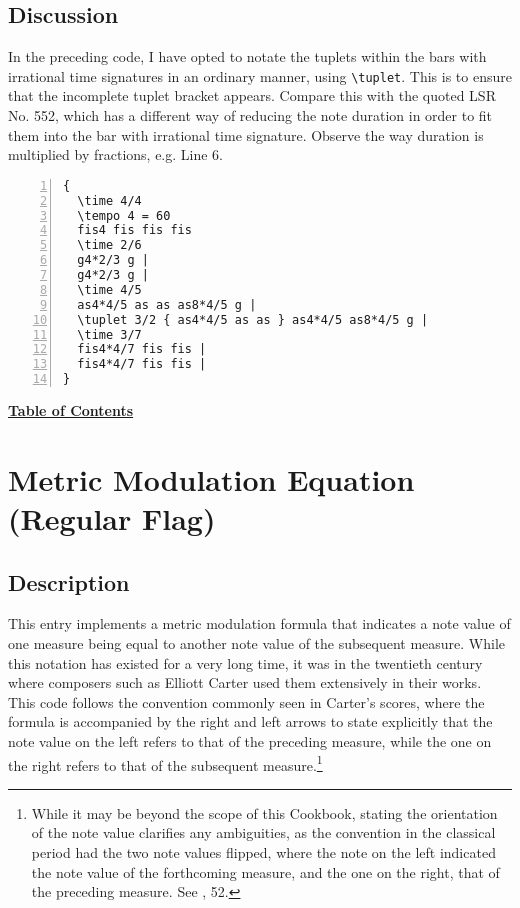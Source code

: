 \subsection{Discussion}

In the preceding code, I have opted to notate the tuplets within the bars with irrational time signatures in an ordinary manner, using \Verb|\tuplet|. This is to ensure that the incomplete tuplet bracket appears. Compare this with the quoted LSR No. 552, which has a different way of reducing the note duration in order to fit them into the bar with irrational time signature. Observe the way duration is multiplied by fractions, e.g. Line 6.

\begin{Verbatim}[numbers=left,xleftmargin=5mm]
 {
  \time 4/4
  \tempo 4 = 60
  fis4 fis fis fis
  \time 2/6
  g4*2/3 g |
  g4*2/3 g |
  \time 4/5
  as4*4/5 as as as8*4/5 g |
  \tuplet 3/2 { as4*4/5 as as } as4*4/5 as8*4/5 g |
  \time 3/7
  fis4*4/7 fis fis |
  fis4*4/7 fis fis |
}
\end{Verbatim}


\hyperref[sec:toc]{\textbf{Table of Contents}}

\vfill \break






\section {Metric Modulation Equation (Regular Flag)}
\label{sec:metricModulationRegularFlag}
\subsection{Description}

This entry implements a metric modulation formula that indicates a note value of one measure being equal to another note value of the subsequent measure. While this notation has existed for a very long time, it was in the twentieth century where composers such as Elliott Carter used them extensively in their works. This code follows the convention commonly seen in Carter's scores, where the formula is accompanied by the right and left arrows to state explicitly that the note value on the left refers to that of the preceding measure, while the one on the right refers to that of the subsequent measure.\footnote{While it may be beyond the scope of this Cookbook, stating the orientation of the note value clarifies any ambiguities, as the convention in the classical period had the two note values flipped, where the note on the left indicated the note value of the forthcoming measure, and the one on the right, that of the preceding measure. See \cite{RN1757}, 52. } \par\hfill\par

